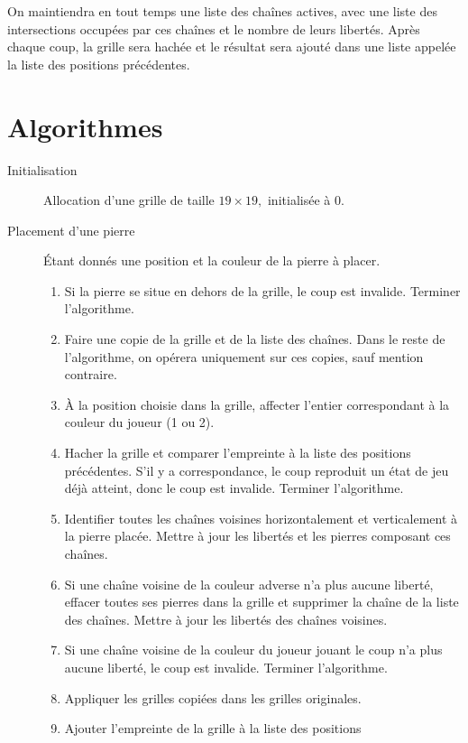 On maintiendra en tout temps une liste des chaînes actives, avec une
liste des intersections occupées par ces chaînes et le nombre de leurs libertés.
Après chaque coup, la grille sera hachée et le résultat sera ajouté
dans une liste appelée la liste des positions précédentes.

\section{Algorithmes}

\begin{description}
    \item[Initialisation] Allocation d'une grille de taille
    $19 \times 19,$ initialisée à $0$.
    \item[Placement d'une pierre] Étant donnés une position et
    la couleur de la pierre à placer.
    \begin{enumerate}
        \item Si la pierre se situe en dehors de la grille, le coup est invalide.
        Terminer l'algorithme.
        \item Faire une copie de la grille et de la liste des chaînes. Dans le
        reste de l'algorithme, on opérera uniquement sur ces copies, sauf mention contraire.
        \item À la position choisie dans la grille, affecter l'entier correspondant
        à la couleur du joueur (1 ou 2).
        \item Hacher la grille et comparer l'empreinte à la liste des positions
        précédentes. S'il y a correspondance, le coup reproduit un état de jeu déjà
        atteint, donc le coup est invalide. Terminer l'algorithme.
        \item Identifier toutes les chaînes voisines horizontalement et
        verticalement à la pierre placée. Mettre à jour les libertés et
        les pierres composant ces chaînes.
        \item Si une chaîne voisine de la couleur adverse n'a plus aucune
        liberté, effacer toutes ses pierres dans la grille et supprimer la
        chaîne de la liste des chaînes. Mettre à jour les libertés des
        chaînes voisines.
        \item Si une chaîne voisine de la couleur du joueur jouant le coup
        n'a plus aucune liberté, le coup est invalide. Terminer
        l'algorithme.
        \item Appliquer les grilles copiées dans les grilles originales.
        \item Ajouter l'empreinte de la grille à la liste des positions

\end{enumerate}
\end{description}
